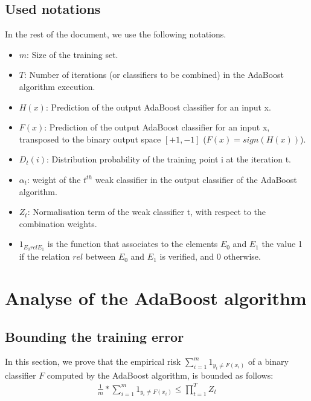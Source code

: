 \documentclass[12pt]{article}											%
\begin{document}
\subsection{Used notations}
In the rest of the document, we use the following notations.
\begin{itemize}
	\item $m$: Size of the training set.
	\item $T$: Number of iterations (or classifiers to be combined) in the AdaBoost algorithm execution.
	\item $H(x)$: Prediction of the output AdaBoost classifier for an input x.
	\item $F(x)$: Prediction of the output AdaBoost classifier for an input x, transposed to the binary output space $[+1, -1]$ ($F(x) = sign(H(x))$).
	\item $D_t(i)$:  Distribution probability of the training point i at the iteration t.
	\item $\alpha_t$: weight of the $t^{th}$ weak classifier in the output classifier of the AdaBoost algorithm.
	\item $Z_t$: Normalisation term of the weak classifier t, with respect to the combination weights.
    \item $1_{E_0 rel E_1}$ is the function that associates to the elements $E_0$ and $E_1$ the value 1 if the relation $rel$ between $E_0$ and $E_1$ is verified, and 0 otherwise.
\end{itemize}



%
\section{Analyse of the AdaBoost algorithm }
\subsection{Bounding the training error}
In this section, we prove that the empirical risk $\sum_{i=1}^{m} {1_{y_i \neq F(x_i)}}$ of a binary classifier $F$ computed by the AdaBoost algorithm, is bounded as follows: 
	\begin{equation}
	\begin{aligned}
		\frac{1}{m} * \sum_{i=1}^{m} {1_{y_i \neq F(x_i)}} \leq \prod_{t=1}^{T}{Z_t}
        \label{equation:boundedTrainingError}
	\end{aligned}
	\end{equation}
\end{document}
